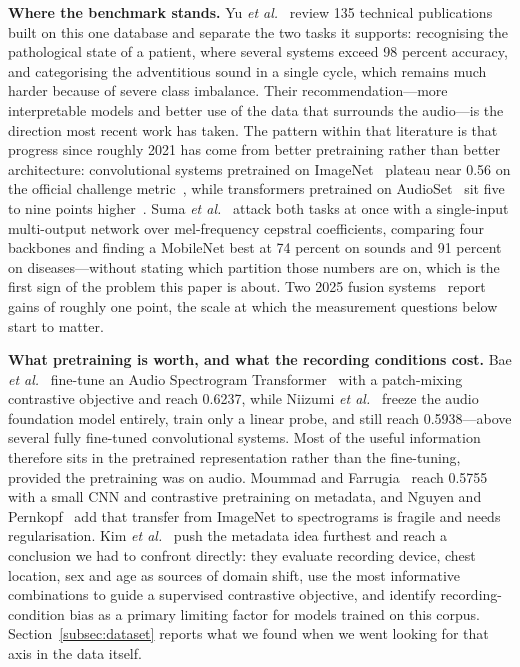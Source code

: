 \documentclass[journal,onecolumn]{IEEEtran}
\begin{document}
\textbf{Where the benchmark stands.} Yu \emph{et al.}~\cite{electronics2025review} review 135
technical publications built on this one database and separate the two tasks it supports:
recognising the pathological state of a patient, where several systems exceed 98 percent
accuracy, and categorising the adventitious sound in a single cycle, which remains much harder
because of severe class imbalance. Their recommendation---more interpretable models and better
use of the data that surrounds the audio---is the direction most recent work has taken. The
pattern within that literature is that progress since roughly 2021 has come from better
pretraining rather than better architecture: convolutional systems pretrained on
ImageNet~\cite{deng2009imagenet} plateau near 0.56 on the official challenge
metric~\cite{respirenet2021}, while transformers pretrained on
AudioSet~\cite{gemmeke2017audioset} sit five to nine points
higher~\cite{bae2023patchmix,bts2024,pafa2025}. Suma \emph{et al.}~\cite{suma2025mtl} attack
both tasks at once with a single-input multi-output network over mel-frequency cepstral
coefficients, comparing four backbones and finding a MobileNet best at 74 percent on sounds and
91 percent on diseases---without stating which partition those numbers are on, which is the
first sign of the problem this paper is about. Two 2025 fusion
systems~\cite{adffnet2025,bspc2025fusion} report gains of roughly one point, the scale at which
the measurement questions below start to matter.

\textbf{What pretraining is worth, and what the recording conditions cost.} Bae
\emph{et al.}~\cite{bae2023patchmix} fine-tune an Audio Spectrogram
Transformer~\cite{gong2021ast} with a patch-mixing contrastive objective and reach 0.6237,
while Niizumi \emph{et al.}~\cite{frozenfm2025} freeze the audio foundation model entirely,
train only a linear probe, and still reach 0.5938---above several fully fine-tuned
convolutional systems. Most of the useful information therefore sits in the pretrained
representation rather than the fine-tuning, provided the pretraining was on audio. Moummad and
Farrugia~\cite{scl2023} reach 0.5755 with a small CNN and contrastive pretraining on metadata,
and Nguyen and Pernkopf~\cite{nguyen2022cotuning} add that transfer from ImageNet to
spectrograms is fragile and needs regularisation. Kim \emph{et al.}~\cite{kim2025metadata}
push the metadata idea furthest and reach a conclusion we had to confront directly: they
evaluate recording device, chest location, sex and age as sources of domain shift, use the most
informative combinations to guide a supervised contrastive objective, and identify
recording-condition bias as a primary limiting factor for models trained on this corpus.
Section~\ref{subsec:dataset} reports what we found when we went looking for that axis in the
data itself.
\end{document}
